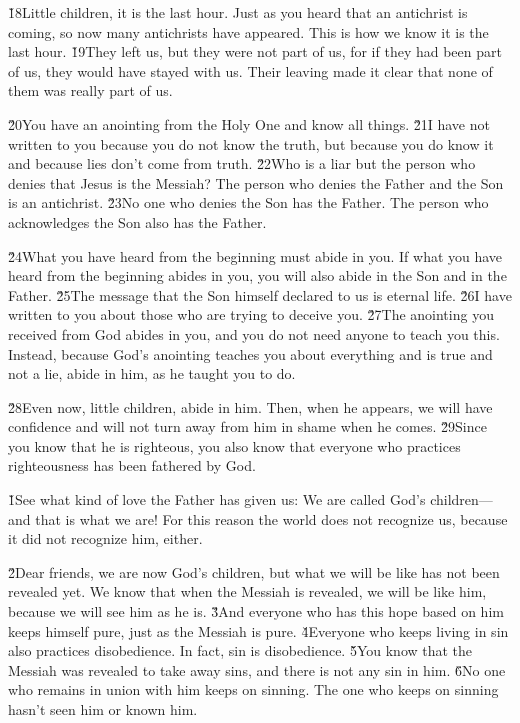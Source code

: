 \v{18}Little children, it is the last hour. Just as you heard that an antichrist is coming, so now many antichrists have appeared. This is how we know it is the last hour. \v{19}They left us, but they were not part of us, for if they had been part of us, they would have stayed with us. Their leaving made it clear that none of them was really part of us.

\v{20}You have an anointing from the Holy One and know all things. \v{21}I have not written to you because you do not know the truth, but because you do know it and because lies don't come from truth. \v{22}Who is a liar but the person who denies that Jesus is the Messiah? The person who denies the Father and the Son is an antichrist. \v{23}No one who denies the Son has the Father. The person who acknowledges the Son also has the Father.

\v{24}What you have heard from the beginning must abide in you. If what you have heard from the beginning abides in you, you will also abide in the Son and in the Father. \v{25}The message that the Son himself declared to us is eternal life. \v{26}I have written to you about those who are trying to deceive you. \v{27}The anointing you received from God abides in you, and you do not need anyone to teach you this. Instead, because God's anointing teaches you about everything and is true and not a lie, abide in him, as he taught you to do.

\v{28}Even now, little children, abide in him. Then, when he appears, we will have confidence and will not turn away from him in shame when he comes. \v{29}Since you know that he is righteous, you also know that everyone who practices righteousness has been fathered by God.

\v{1}See what kind of love the Father has given us: We are called God's children---and that is what we are! For this reason the world does not recognize us, because it did not recognize him, either.

\v{2}Dear friends, we are now God's children, but what we will be like has not been revealed yet. We know that when the Messiah is revealed, we will be like him, because we will see him as he is. \v{3}And everyone who has this hope based on him keeps himself pure, just as the Messiah is pure. \v{4}Everyone who keeps living in sin also practices disobedience. In fact, sin is disobedience. \v{5}You know that the Messiah was revealed to take away sins, and there is not any sin in him. \v{6}No one who remains in union with him keeps on sinning. The one who keeps on sinning hasn't seen him or known him.

